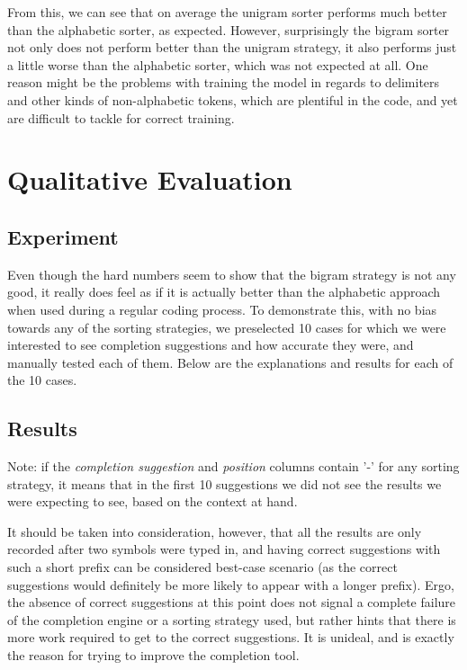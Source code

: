 From this, we can see that on average the unigram sorter performs much better than the alphabetic sorter, as expected. However, surprisingly the bigram sorter not only does not perform better than the unigram strategy, it also performs just a little worse than the alphabetic sorter, which was not expected at all. One reason might be the problems with training the model in regards to delimiters and other kinds of non-alphabetic tokens, which are plentiful in the code, and yet are difficult to tackle for correct training.

\section{Qualitative Evaluation}
\label{sec:Evaluation-Qualitative}
\subsection{Experiment}
Even though the hard numbers seem to show that the bigram strategy is not any good, it really does feel as if it is actually better than the alphabetic approach when used during a regular coding process. To demonstrate this, with no bias towards any of the sorting strategies, we preselected 10 cases for which we were interested to see completion suggestions and how accurate they were, and manually tested each of them. Below are the explanations and results for each of the 10 cases.

\subsection{Results}
Note: if the \textit{completion suggestion} and \textit{position} columns contain '-' for any sorting strategy, it means that in the first 10 suggestions we did not see the results we were expecting to see, based on the context at hand.

It should be taken into consideration, however, that all the results are only recorded after two symbols were typed in, and having correct suggestions with such a short prefix can be considered best-case scenario (as the correct suggestions would definitely be more likely to appear with a longer prefix). Ergo, the absence of correct suggestions at this point does not signal a complete failure of the completion engine or a sorting strategy used, but rather hints that there is more work required to get to the correct suggestions. It is unideal, and is exactly the reason for trying to improve the completion tool.

